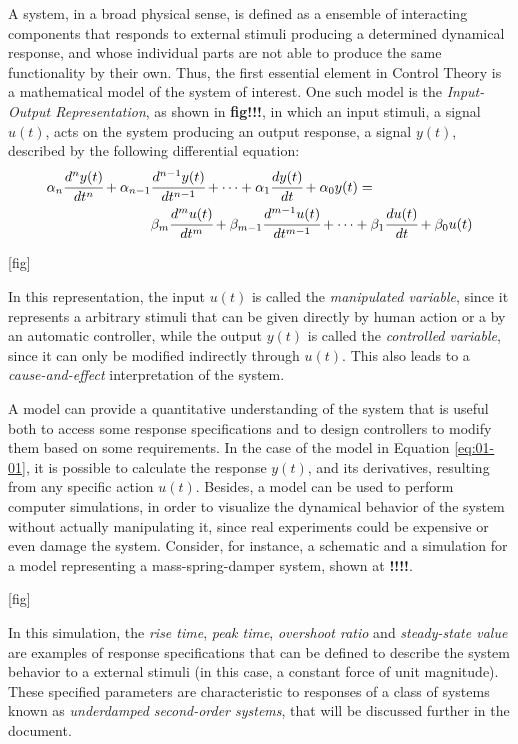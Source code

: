 \documentclass[a4paper,11pt]{book}
\numberwithin{figure}{chapter}
\numberwithin{equation}{chapter}
\numberwithin{table}{chapter}
\theoremstyle{definition}
\begin{document}
A system, in a broad physical sense, is defined as a ensemble of interacting components that responds to external stimuli producing a determined dynamical response, and whose individual parts are not able to produce the same functionality by their own. Thus, the first essential element in Control Theory is a mathematical model of the system of interest. One such model is the \textit{Input-Output Representation}, as shown in \textbf{fig!!!}, in which an input stimuli, a signal $u(t)$, acts on the system producing an output response, a signal $y(t)$, described by the following differential equation:
\begin{equation} \label{eq:01-01}
\begin{split}
    \alpha_n \cfrac{d^n y(t)}{dt^n} + \alpha_{n-1} & \cfrac{d^{n-1} y(t)}{dt^{n-1}} + \cdots + \alpha_{1} \cfrac{d y(t)}{dt} + \alpha_{0} y(t) = \\
    & \beta_m \cfrac{d^m u(t)}{dt^m} + \beta_{m-1} \cfrac{d^{m-1} u(t)}{dt^{m-1}} + \cdots + \beta_{1} \cfrac{d u(t)}{dt} + \beta_{0} u(t)
\end{split}
\end{equation}

[fig]

In this representation, the input $u(t)$ is called the \textit{manipulated variable}, since it represents a arbitrary stimuli that can be given directly by human action or a by an automatic controller, while the output $y(t)$ is called the \textit{controlled variable}, since it can only be modified indirectly through $u(t)$. This also leads to a \textit{cause-and-effect} interpretation of the system.

A model can provide a quantitative understanding of the system that is useful both to access some response specifications and to design controllers to modify them based on some requirements. In the case of the model in Equation \eqref{eq:01-01}, it is possible to calculate the response $y(t)$, and its derivatives, resulting from any specific action $u(t)$. Besides, a model can be used to perform computer simulations, in order to visualize the dynamical behavior of the system without actually manipulating it, since real experiments could be expensive or even damage the system. Consider, for instance, a schematic and a simulation for a model representing a mass-spring-damper system, shown at \textbf{!!!!}.

[fig]

In this simulation, the \textit{rise time}, \textit{peak time}, \textit{overshoot ratio} and \textit{steady-state value} are examples of response specifications that can be defined to describe the system behavior to a external stimuli (in this case, a constant force of unit magnitude). These specified parameters are characteristic to responses of a class of systems known as \textit{underdamped second-order systems}, that will be discussed further in the document. 
\end{document}
